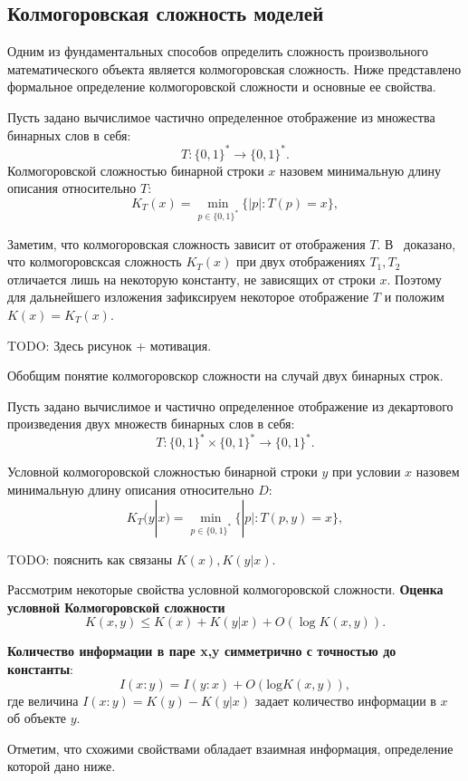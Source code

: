 \documentclass[../main.tex]{subfiles}
\begin{document}
\subsection{Колмогоровская сложность моделей}

Одним из фундаментальных способов определить сложность произвольного математического объекта является колмогоровская сложность. Ниже представлено формальное определение колмогоровской сложности и основные ее свойства.


\begin{definition}
Пусть задано вычислимое частично определенное отображение из множества бинарных слов в себя:
\[
T: \{0,1\}^{*}  \to  \{0,1\}^{*}.
\]
Колмогоровской сложностью бинарной строки $x$ назовем минимальную длину описания относительно $T$:
\[
K_T(x) = \min_{p \in \{0,1\}^*}\{|p|: T(p) = x\},
\]
\end{definition}
Заметим, что колмогоровская сложность зависит от отображения $T$. В~\cite{kolmogorov} доказано, что колмогоровсксая сложность $K_T(x)$ при двух отображениях $T_1, T_2$ отличается лишь на некоторую константу, не зависящих от строки $x$. Поэтому для дальнейшего изложения зафиксируем некоторое отображение $T$ и положим $K(x) = K_T(x)$.

TODO: Здесь рисунок + мотивация.

Обобщим понятие колмогоровскор сложности на случай двух бинарных строк.

\begin{definition}
Пусть задано вычислимое и частично определенное отображение из декартового произведения двух множеств бинарных слов в себя:
\[
T: \{0,1\}^{*} \times  \{0,1\}^{*} \to  \{0,1\}^{*}.
\]

Условной колмогоровской сложностью бинарной строки $y$ при условии $x$ назовем минимальную длину описания относительно $D$:
\[
K_T(y|x) = \min_{p \in \{0,1\}^*}\{|p|: T(p, y) = x\},
\]
\end{definition}
TODO: пояснить как связаны $K(x), K(y|x)$.

Рассмотрим некоторые свойства условной колмогоровской сложности.
\textbf{Оценка условной Колмогоровской сложности}~\cite{kolmogorov}
\[
	K(x,y) \leq K(x) + K(y|x) + O(\log K(x,y)).
\]


\textbf{Количество информации в паре x,y симметрично с точностью до константы}:
\[
I(x:y) = I(y:x) + O(\text{log}K(x,y)),
\]
где величина $I(x:y) = K(y) - K(y|x)$  задает количество информации в $x$ об объекте $y$. 

Отметим, что схожими свойствами обладает взаимная информация, определение которой дано ниже.
\end{document}
